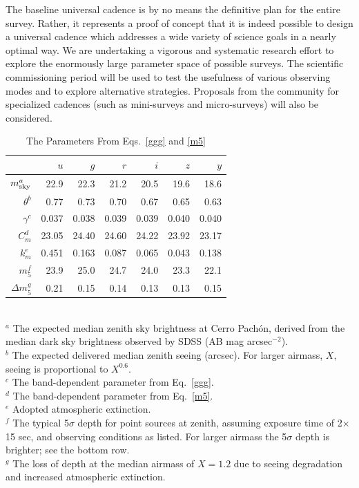 \documentclass{emulateapj}
\begin{document}
The baseline universal cadence is by no means the definitive plan for the entire
survey. Rather, it represents a proof of concept that it is indeed possible to 
design a universal cadence which addresses a wide variety of science goals in a nearly 
optimal way. We are undertaking a vigorous and systematic research effort to explore 
the enormously large parameter space of possible surveys. The
scientific commissioning period 
will be used to test the usefulness of various observing modes and to explore 
alternative strategies. Proposals from the community
for specialized cadences (such as mini-surveys and
micro-surveys) will also be considered.  



\begin{table}
\caption{The Parameters From Eqs.~\ref{ggg} and \ref{m5}}
\begin{tabular}{|r|r|r|r|r|r|r|}
\hline  
              &   $u$  &   $g$   & $r$   &  $i$  & $z$  & $y$  \\
\hline  
   $m_{\rm sky}^a$ &   22.9    & 22.3    & 21.2    & 20.5    & 19.6    &  18.6  \\
   $\theta^b$      &   0.77    & 0.73    & 0.70    & 0.67    &  0.65   &  0.63  \\
  $\gamma^c$       &   0.037   & 0.038   & 0.039   & 0.039   & 0.040   & 0.040 \\
  $C_m^d$        &   23.05   & 24.40   & 24.60   & 24.22   & 23.92   & 23.17 \\
    $k_m^e$       &    0.451   &  0.163   &  0.087   &  0.065   &  0.043   &  0.138 \\
    $m_5^f$        &   23.9    & 25.0    & 24.7    &  24.0   & 23.3    & 22.1  \\
    $\Delta m_5^g$ &   0.21    & 0.15   & 0.14    &  0.13   & 0.13    & 0.15  \\
\hline                         
\end{tabular}
  \\ \vskip 0.05in
  $^a$ The expected median zenith sky brightness at Cerro Pach\'on, derived 
       from the median dark sky brightness observed by SDSS (AB mag arcsec$^{-2}$). \\
  $^b$ The expected delivered median zenith seeing (arcsec). For larger
       airmass, $X$, seeing is proportional to $X^{0.6}$. \\
  $^c$ The band-dependent parameter from Eq.~\ref{ggg}. \\
  $^d$ The band-dependent parameter from Eq.~\ref{m5}. \\
  $^e$ Adopted atmospheric extinction. \\
  $^f$ The typical 5$\sigma$ depth for point sources at zenith, assuming exposure time of 
       2$\times$15 sec, and observing conditions as listed. For larger
       airmass the 5$\sigma$ depth is brighter; see the bottom row. \\
  $^g$ The loss of depth at the median airmass of $X=1.2$ due to seeing degradation 
       and increased atmospheric extinction. \\
\end{table}
\end{document}
